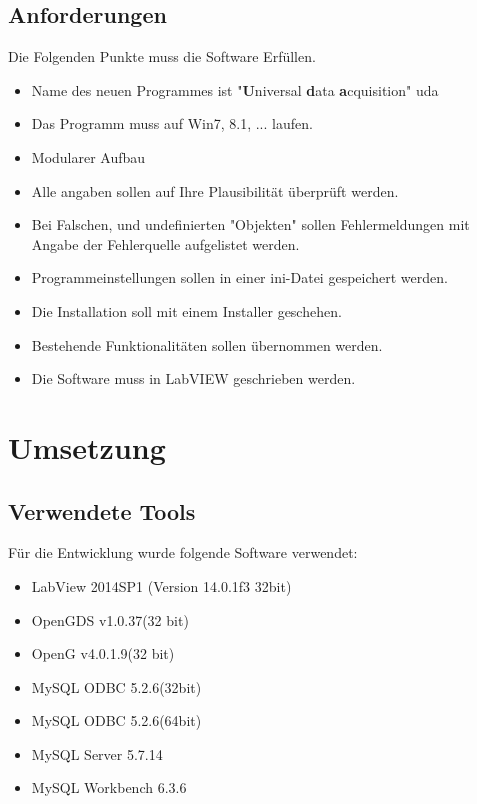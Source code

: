 \documentclass[10pt]{scrartcl}
\begin{document}
\subsection{Anforderungen}
Die Folgenden Punkte muss die Software Erfüllen.
\begin{itemize}
	\item Name des neuen Programmes ist "\textbf{U}niversal \textbf{d}ata \textbf{a}cquisition" \acrshort{uda}
	\item Das Programm muss auf Win7, 8.1, ... laufen.
	\item Modularer Aufbau
	\item Alle angaben sollen auf Ihre Plausibilität überprüft werden.
	\item Bei Falschen, und undefinierten "Objekten" sollen Fehlermeldungen mit Angabe der Fehlerquelle aufgelistet werden.
	\item Programmeinstellungen sollen in einer ini-Datei gespeichert werden.
	\item Die Installation soll mit einem Installer geschehen.
	\item Bestehende Funktionalitäten sollen übernommen werden.
	\item Die Software muss in \gls{LabVIEW} geschrieben werden.
\end{itemize}
\section{Umsetzung}
\subsection{Verwendete Tools}
Für die Entwicklung wurde folgende Software verwendet:
\begin{itemize}
	\item LabView 2014SP1 (Version 14.0.1f3 32bit)
	\item OpenGDS v1.0.37(32 bit)
	\item OpenG v4.0.1.9(32 bit)
	\item MySQL ODBC 5.2.6(32bit)
	\item MySQL ODBC 5.2.6(64bit)
	\item MySQL Server 5.7.14
	\item MySQL Workbench 6.3.6
\end{itemize}
\end{document}
